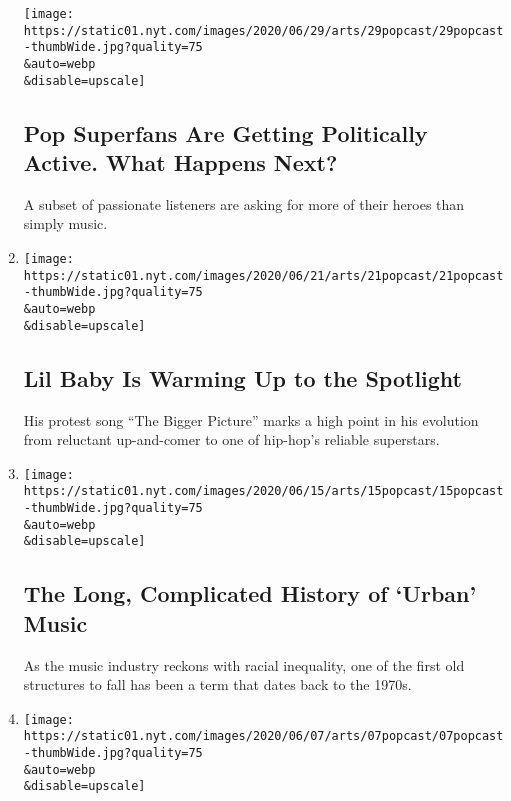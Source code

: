 \begin{enumerate}
  \texttt{[image: https://static01.nyt.com/images/2020/06/29/arts/29popcast/29popcast-thumbWide.jpg?quality=75\\\&auto=webp\\\&disable=upscale]}

  \hypertarget{pop-superfans-are-getting-politically-active-what-happens-next}{%
  \subsection{Pop Superfans Are Getting Politically Active. What Happens
  Next?}\label{pop-superfans-are-getting-politically-active-what-happens-next}}

  A subset of passionate listeners are asking for more of their heroes
  than simply music.
\item
  \href{/2020/06/21/arts/music/popcast-lil-baby.html}{}

  \texttt{[image: https://static01.nyt.com/images/2020/06/21/arts/21popcast/21popcast-thumbWide.jpg?quality=75\\\&auto=webp\\\&disable=upscale]}

  \hypertarget{lil-baby-is-warming-up-to-the-spotlight}{%
  \subsection{Lil Baby Is Warming Up to the
  Spotlight}\label{lil-baby-is-warming-up-to-the-spotlight}}

  His protest song ``The Bigger Picture'' marks a high point in his
  evolution from reluctant up-and-comer to one of hip-hop's reliable
  superstars.
\item
  \href{/2020/06/15/arts/music/popcast-urban-music.html}{}

  \texttt{[image: https://static01.nyt.com/images/2020/06/15/arts/15popcast/15popcast-thumbWide.jpg?quality=75\\\&auto=webp\\\&disable=upscale]}

  \hypertarget{the-long-complicated-history-of-urban-music}{%
  \subsection{The Long, Complicated History of `Urban'
  Music}\label{the-long-complicated-history-of-urban-music}}

  As the music industry reckons with racial inequality, one of the first
  old structures to fall has been a term that dates back to the 1970s.
\item
  \href{/2020/06/07/arts/music/popcast-the-source-rodney-king.html}{}

  \texttt{[image: https://static01.nyt.com/images/2020/06/07/arts/07popcast/07popcast-thumbWide.jpg?quality=75\\\&auto=webp\\\&disable=upscale]}


\end{enumerate}
